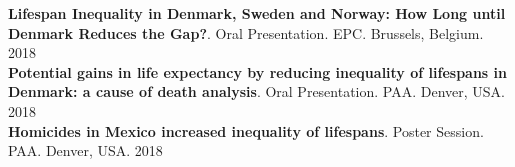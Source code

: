 \documentclass[12pt]{article}
\begin{document}
\textbf{Lifespan Inequality in Denmark, Sweden and Norway: How Long until Denmark Reduces the Gap?}. Oral Presentation. EPC. Brussels, Belgium. \hfill { 2018}\\

\textbf{Potential gains in life expectancy by reducing inequality of lifespans in Denmark: a cause of death analysis}. Oral Presentation. PAA. Denver, USA. \hfill { 2018}\\

\textbf{Homicides in Mexico increased inequality of lifespans}. Poster Session. PAA. Denver, USA. \hfill { 2018}\\
%
%
%
%
%
%
%
%
%
%
%
%
\end{document}
